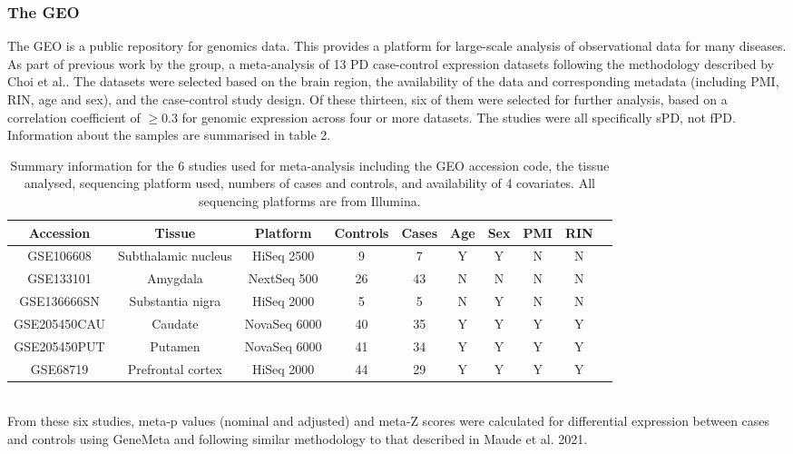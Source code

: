 \documentclass{article}
\begin{document}
\subsubsection{The GEO}
The GEO \cite{Barrett2012NCBISetsupdate} is a public repository for genomics data. This provides a platform for large-scale analysis of observational data for many diseases. As part of previous work by the group, a meta-analysis of 13 PD case-control expression datasets following the methodology described by Choi et al.\cite{Choi2003CombiningVariation}. The datasets were selected based on the brain region, the availability of the data and corresponding metadata (including PMI, RIN, age and sex), and the case-control study design. Of these thirteen, six of them were selected for further analysis, based on a correlation coefficient of $\geq0.3$ for genomic expression across four or more datasets. The studies were all specifically sPD, not fPD. Information about the samples are summarised in table 2.
\begin{table}[h]
    \hskip0cm
    \centering
    \caption{Summary information for the 6 studies used for meta-analysis including the GEO accession code, the tissue analysed, sequencing platform used, numbers of cases and controls, and availability of 4 covariates. All sequencing platforms are from Illumina.}
    \begin{tabular}{ |c|c|c|c|c|c|c|c|c|c| }
        \hline
        Accession & Tissue & Platform & Controls & Cases & Age & Sex & PMI & RIN \\ \hline
        GSE106608 & Subthalamic nucleus & HiSeq 2500 & 9 & 7 & Y & Y & N & N \\ \hline
        GSE133101 & Amygdala & NextSeq 500 & 26 & 43 & N & N & N & N \\ \hline
        GSE136666SN & Substantia nigra & HiSeq 2000 & 5 & 5 & N & Y & N & N \\ \hline
        GSE205450CAU & Caudate & NovaSeq 6000 & 40 & 35 & Y & Y & Y & Y \\ \hline
        GSE205450PUT & Putamen & NovaSeq 6000 & 41 & 34 & Y & Y & Y & Y \\ \hline
        GSE68719 & Prefrontal cortex & HiSeq 2000 & 44 & 29 & Y & Y & Y & Y \\ \hline
    \end{tabular}
    \label{tab:my_label}
\end{table}
\\From these six studies, meta-p values (nominal and adjusted) and meta-Z scores were calculated for differential expression between cases and controls using GeneMeta\cite{LusaL2024GeneMeta:Experiments.} and following similar methodology to that described in Maude et al. 2021\cite{Maude2021NewDiabetes.}.
\end{document}
